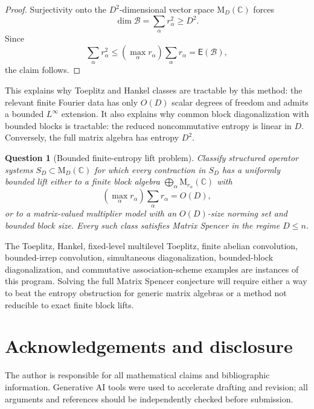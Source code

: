 \documentclass[11pt]{amsart}
\numberwithin{equation}{section}
\newtheorem{question}[theorem]{Question}
\theoremstyle{definition}
\theoremstyle{remark}
\newcommand{\C}{\mathbb C}
\newcommand{\M}{\mathrm M}
\newcommand{\Ent}{\mathsf E}
\newcommand{\mcB}{\mathcal B}
\begin{document}
\begin{proof}
Surjectivity onto the $D^2$-dimensional vector space $\M_D(\C)$ forces
\[
\dim\mcB=\sum_\alpha r_\alpha^2\ge D^2 .
\]
Since
\[
\sum_\alpha r_\alpha^2
\le \left(\max_\alpha r_\alpha\right)\sum_\alpha r_\alpha
=\Ent(\mcB),
\]
the claim follows.
\end{proof}

This explains why Toeplitz and Hankel classes are tractable by this method:
the relevant finite Fourier data has only $O(D)$ scalar degrees of freedom and
admits a bounded $L^\infty$ extension. It also explains why common block
diagonalization with bounded blocks is tractable: the reduced noncommutative
entropy is linear in $D$. Conversely, the full matrix algebra has entropy
$D^2$.

\begin{question}[Bounded finite-entropy lift problem]
Classify structured operator systems $S_D\subset\M_D(\C)$ for which every
contraction in $S_D$ has a uniformly bounded lift either to a finite block
algebra $\bigoplus_\alpha\M_{r_\alpha}(\C)$ with
\[
\left(\max_\alpha r_\alpha\right)\sum_\alpha r_\alpha=O(D),
\]
or to a matrix-valued multiplier model with an $O(D)$-size norming set and
bounded block size. Every such class satisfies Matrix Spencer in the regime
$D\le n$.
\end{question}

The Toeplitz, Hankel, fixed-level multilevel Toeplitz, finite abelian
convolution, bounded-irrep convolution, simultaneous diagonalization,
bounded-block diagonalization, and commutative association-scheme examples are
instances of this program. Solving the full Matrix Spencer conjecture will
require either a way to beat the entropy obstruction for generic matrix algebras
or a method not reducible to exact finite block lifts.

\section*{Acknowledgements and disclosure}
The author is responsible for all mathematical claims and bibliographic
information. Generative AI tools were used to accelerate drafting and revision;
all arguments and references should be independently checked before submission.
\end{document}
